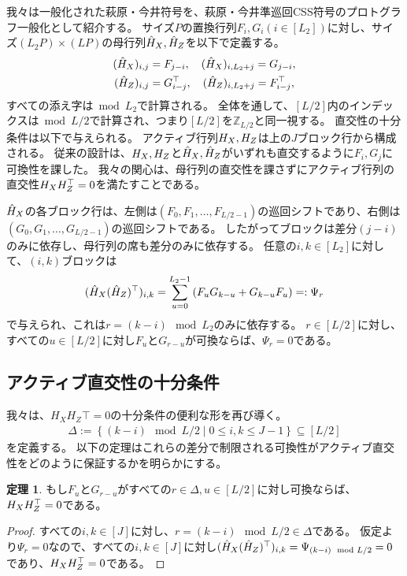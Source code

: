 \documentclass[a4paper,11pt,dvipdfmx]{jsarticle}
\theoremstyle{definition}
\newtheorem{theorem}[definition]{定理}
\begin{document}
我々は一般化された萩原・今井符号を、萩原・今井準巡回CSS符号のプロトグラフ一般化として紹介する。
サイズ$P$の置換行列$F_i,G_i(i\in[L_2])$に対し、サイズ$(L_2P)\times (LP)$の母行列$\hat{H}_X,\hat{H}_Z$を以下で定義する。
\begin{align}
  (\hat{H}_X)_{i,j} &= F_{j-i},\quad (\hat{H}_X)_{i,L_2+j}=G_{j-i},\\
  (\hat{H}_Z)_{i,j} &= G_{i-j}^\top,\quad (\hat{H}_Z)_{i,L_2+j}=F_{i-j}^\top,
\end{align}
すべての添え字は$\bmod{L_2}$で計算される。
全体を通して、$[L/2]$内のインデックスは$\bmod{L/2}$で計算され、つまり$[L/2]$を$\mathbb{Z}_{L/2}$と同一視する。
直交性の十分条件は以下で与えられる。
アクティブ行列$H_X,H_Z$は上の$J$ブロック行から構成される。
従来の設計は、$H_X,H_Z$と$\hat{H}_X,\hat{H}_Z$がいずれも直交するように$F_i,G_j$に可換性を課した。
我々の関心は、母行列の直交性を課さずにアクティブ行列の直交性$H_XH_Z^\top = 0$を満たすことである。

$\hat{H}_X$の各ブロック行は、左側は$(F_0,F_1,\dots,F_{L/2-1})$の巡回シフトであり、右側は$(G_0,G_1,\dots,G_{L/2-1})$の巡回シフトである。
したがってブロックは差分$(j-i)$のみに依存し、母行列の席も差分のみに依存する。
任意の$i,k\in[L_2]$に対して、$(i,k)$ブロックは
\begin{align}
  (\hat{H}_X(\hat{H}_Z)^\top)_{i,k} = \sum_{u=0}^{L_2-1}\left(F_uG_{k-u} + G_{k-u}F_u\right) =: \Psi_r
\end{align}
で与えられ、これは$r=(k-i)\mod L_2$のみに依存する。
$r\in[L/2]$に対し、すべての$u\in[L/2]$に対し$F_u$と$G_{r-u}$が可換ならば、$\Psi_r=0$である。

\subsection{アクティブ直交性の十分条件}
我々は、$H_XH_Z\top=0$の十分条件の便利な形を再び導く。
\begin{align}
  \Delta := \left\{(k-i)\mod L/2\mid 0\leq i,k\leq J-1\right\}\subseteq[L/2]
\end{align}
を定義する。
以下の定理はこれらの差分で制限される可換性がアクティブ直交性をどのように保証するかを明らかにする。
\begin{theorem}
  もし$F_u$と$G_{r-u}$がすべての$r\in\Delta,u\in[L/2]$に対し可換ならば、$H_XH_Z^\top=0$である。
\end{theorem}
\begin{proof}
  すべての$i,k\in[J]$に対し、$r=(k-i)\mod L/2\in \Delta$である。
  仮定より$\Psi_r=0$なので、すべての$i,k\in[J]$に対し$(\hat{H}_X(\hat{H}_Z)^\top)_{i,k}=\Psi_{(k-i)\mod L/2}=0$であり、$H_XH_Z^\top=0$である。
\end{proof}
\end{document}
